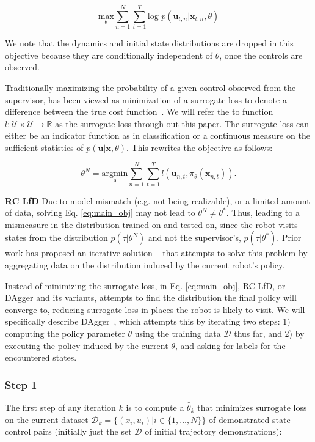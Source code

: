 \documentclass[10pt, conference]{ieeeconf}      %
\newcommand{\bu}{\mathbf{u}}
\newcommand{\bx}{\mathbf{x}}
\newcommand{\nc}{RC LfD }
\begin{document}
\begin{equation}\label{eq:m_likeli_obj}
\underset{\theta}{\mbox{max}} \sum^N_{n=1}\sum^T_{t=1}\mbox{log }p(\bu_{t,n}|\bx_{t,n},\theta)
\end{equation}


We note that the dynamics and initial state distributions are dropped in this objective because they are conditionally independent of $\theta$, once the controls are observed. 

 Traditionally maximizing the probability of a given control observed from the supervisor, has been viewed as minimization of a surrogate loss to denote a difference between the true cost function~\cite{ross2010reduction,ross2010efficient}. We will refer the to function $l : \mathcal{U} \times \mathcal{U} \rightarrow \mathbb{R}$ as the surrogate loss through out this paper. The surrogate loss can either be an indicator function as in classification or a continuous measure on the sufficient statistics of $p(\bu|\bx,\theta)$.  This rewrites the objective as follows: 

\begin{equation}\label{eq:main_obj}
\theta^N = \underset{\theta}{\mbox{argmin}} \sum^N_{n=1}\sum^T_{t=1} l(\bu_{n,t}, \pi_{\theta} (\bx_{n,t})).
\end{equation}


\noindent \textbf{\nc} Due to model mismatch (e.g. not being realizable), or a limited amount of data, solving Eq. \ref{eq:main_obj} may not lead to $\theta^N \neq \theta^*$.  Thus, leading to a mismeasure in the distribution trained on and tested on, since the robot visits states from the distribution $p(\tau|\theta^N)$ and not the supervisor's, $p(\tau|\theta^*)$.  Prior work has proposed an iterative solution ~\cite{ross2010reduction} that attempts to solve this problem by aggregating data on the distribution induced by the current robot's policy.

Instead of  minimizing the surrogate loss, in Eq. \ref{eq:main_obj},  RC LfD, or DAgger and its variants, attempts to find the distribution the final policy will converge to, reducing surrogate loss in places the robot is likely to visit.
We will specifically describe DAgger~\cite{ross2010reduction}, which attempts this by iterating two steps: 1)
computing the policy parameter $\theta$ using the training data $\mathcal{D}$ thus far, and 2) by executing the policy
induced by the current $\theta$, and asking for labels for the encountered states. 
 
\subsubsection{Step 1}
The first step of any iteration $k$ is to compute a $\hat{\theta}_k$ that minimizes surrogate loss on the current dataset $\mathcal{D}_k=\{(x_i,u_i)|i\in\{1,\ldots,N\}\}$ of demonstrated state-control pairs (initially just the set $\mathcal{D}$ of initial trajectory demonstrations):
\end{document}
